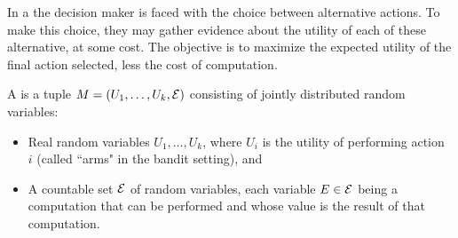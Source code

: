 




In a  the decision maker is faced with the choice between
alternative actions.  To make this choice, they may gather evidence about the
utility of each of these alternative, at some cost.  The objective is to maximize
the expected utility of the final action selected, less the cost of computation.




\begin{dfn} \label{dfn:metalevel-model}
	A  is a tuple $M=(U_1,\dots,U_k,\mathcal{E})$ 
	consisting of jointly distributed random variables:
	\begin{itemize}
		\item Real random variables $U_1,\dots,U_k$, where $U_i$ is the utility of performing action~$i$ (called ``arms" in the bandit setting), and
		\item A countable set $\mathcal{E}$ of random variables, each variable $E\in\mathcal{E}$ being 
		      a computation that can be performed and whose value is the result of that computation.
	\end{itemize}
\end{dfn}

